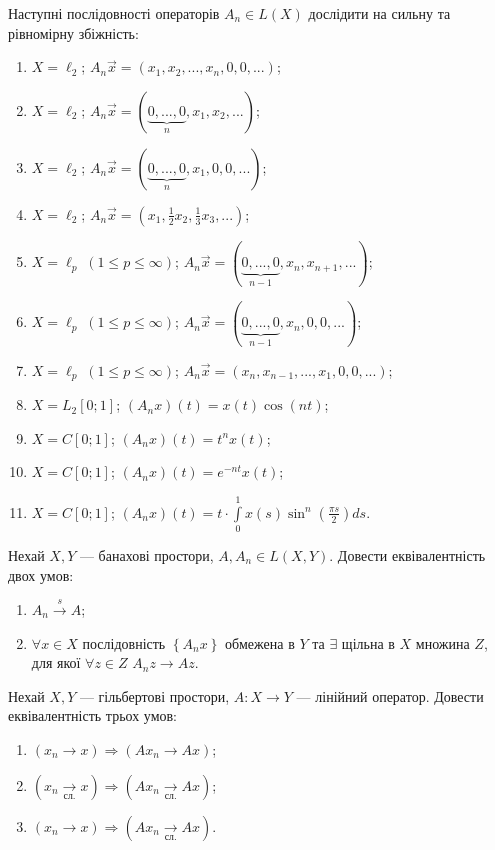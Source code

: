 \begin{exercise}
    Наступні послідовності операторів $A_n \in L(X)$ дослідити на сильну та рівномірну збіжність:
    \begin{enumerate}
        \item $X = \ell_2$; $A_n \vec{x} = (x_1, x_2, ..., x_n, 0, 0, ...)$;
        \item $X = \ell_2$; $A_n \vec{x} = (\underbrace{0, ..., 0}_{n}, x_1, x_2, ...)$;
        \item $X = \ell_2$; $A_n \vec{x} = (\underbrace{0, ..., 0}_{n}, x_1, 0, 0, ...)$;
        \item $X = \ell_2$; $A_n \vec{x} = (x_1, \frac{1}{2} x_2, \frac{1}{3} x_3, ...)$;
        \item $X = \ell_p \; (1 \leq p \leq \infty)$; $A_n \vec{x} = (\underbrace{0, ..., 0}_{n-1}, x_n, x_{n+1}, ...)$;
        \item $X = \ell_p \; (1 \leq p \leq \infty)$; $A_n \vec{x} = (\underbrace{0, ..., 0}_{n-1}, x_n, 0, 0, ...)$;
        \item $X = \ell_p \; (1 \leq p \leq \infty)$; $A_n \vec{x} = (x_n, x_{n-1}, ..., x_1, 0, 0, ...)$;
        \item $X = L_2 [0; 1]$; $(A_n x)(t) = x(t) \cos(nt)$;
        \item $X = C [0; 1]$; $(A_n x)(t) = t^n x(t)$;
        \item $X = C [0; 1]$; $(A_n x)(t) = e^{-nt} x(t)$;
        \item $X = C [0; 1]$; $(A_n x)(t) = t \cdot \int\limits_0^1 x(s) \sin^n (\frac{\pi s}{2}) ds$.
    \end{enumerate}
\end{exercise}

\begin{exercise}
    Нехай $X, Y$ --- банахові простори, $A, A_n \in L(X, Y)$.
    Довести еквівалентність двох умов:
    \begin{enumerate}
        \item $A_n \overset{s}{\rightarrow} A$;
        \item $\forall x \in X$ послідовність $\left\{ A_n x\right\}$ обмежена в $Y$ та $\exists$ щільна
        в $X$ множина $Z$, для якої $\forall z \in Z$ $A_n z \rightarrow A z$.
    \end{enumerate} 
\end{exercise}

\begin{exercise}\label{N:1_4_13}
    Нехай $X, Y$ --- гільбертові простори, $A : X \rightarrow Y$ --- лінійний оператор. 
    Довести еквівалентність трьох умов:
    \begin{enumerate}
        \item $( x_n \rightarrow x) \Rightarrow (A x_n \rightarrow A x)$;
        \item $(x_n \underset{\text{сл.}}{\rightarrow} x ) \Rightarrow (A x_n \underset{\text{сл.}}{\rightarrow} A x )$;
        \item $( x_n \rightarrow x) \Rightarrow (A x_n \underset{\text{сл.}}{\rightarrow} A x )$.
    \end{enumerate}
\end{exercise}

